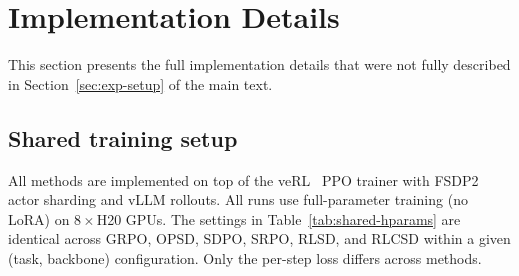 \section{Implementation Details}
\label{app:implement-detail}

This section presents the full implementation details that were not fully described in Section~\ref{sec:exp-setup} of the main text.

\subsection{Shared training setup}
\label{app:shared-hparams}

  All methods are implemented on top of the veRL~\citep{sheng2024hybridflow} PPO
  trainer with FSDP2 actor sharding and vLLM rollouts.
  All runs use full-parameter training (no LoRA) on $8\times$H20 GPUs.
  The settings in Table~\ref{tab:shared-hparams} are identical across
  GRPO, OPSD, SDPO, SRPO, RLSD, and RLCSD within a given (task, backbone)
  configuration. Only the per-step loss differs across methods.

